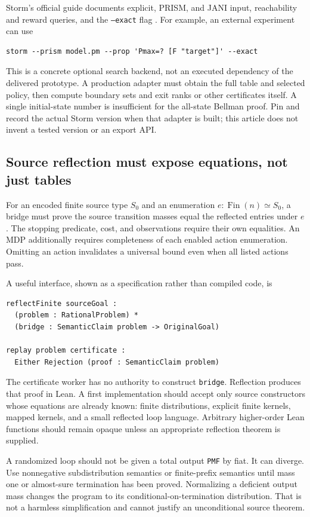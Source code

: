 \documentclass[11pt,letterpaper]{article}
\theoremstyle{definition}\newtheorem{definition}[theorem]{Definition}
\theoremstyle{remark}\newtheorem{remark}[theorem]{Remark}
\newcommand{\code}[1]{\texttt{#1}}
\begin{document}
Storm's official guide documents explicit, PRISM, and JANI input, reachability and reward queries, and the \code{--exact} flag \cite{storm}. For example, an external experiment can use
\begin{lstlisting}
storm --prism model.pm --prop 'Pmax=? [F "target"]' --exact
\end{lstlisting}
This is a concrete optional search backend, not an executed dependency of the delivered prototype. A production adapter must obtain the full table and selected policy, then compute boundary sets and exit ranks or other certificates itself. A single initial-state number is insufficient for the all-state Bellman proof. Pin and record the actual Storm version when that adapter is built; this article does not invent a tested version or an export API.

\subsection{Source reflection must expose equations, not just tables}
For an encoded finite source type $S_0$ and an enumeration $e:\operatorname{Fin}(n)\simeq S_0$, a bridge must prove the source transition masses equal the reflected entries under $e$. The stopping predicate, cost, and observations require their own equalities. An MDP additionally requires completeness of each enabled action enumeration. Omitting an action invalidates a universal bound even when all listed actions pass.

A useful interface, shown as a specification rather than compiled code, is
\begin{lstlisting}
reflectFinite sourceGoal :
  (problem : RationalProblem) *
  (bridge : SemanticClaim problem -> OriginalGoal)

replay problem certificate :
  Either Rejection (proof : SemanticClaim problem)
\end{lstlisting}
The certificate worker has no authority to construct \code{bridge}. Reflection produces that proof in Lean. A first implementation should accept only source constructors whose equations are already known: finite distributions, explicit finite kernels, mapped kernels, and a small reflected loop language. Arbitrary higher-order Lean functions should remain opaque unless an appropriate reflection theorem is supplied.

A randomized loop should not be given a total output \code{PMF} by fiat. It can diverge. Use nonnegative subdistribution semantics or finite-prefix semantics until mass one or almost-sure termination has been proved. Normalizing a deficient output mass changes the program to its conditional-on-termination distribution. That is not a harmless simplification and cannot justify an unconditional source theorem.
\end{document}
